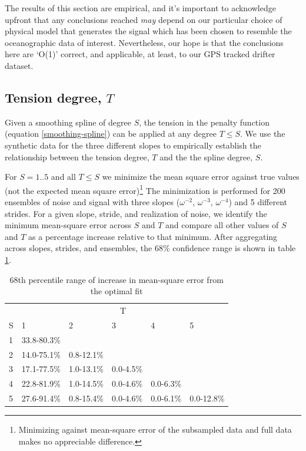 \documentclass[10pt,journal]{IEEEtran}
\begin{document}
The results of this section are empirical, and it's important to acknowledge upfront that any conclusions reached \emph{may} depend on our particular choice of physical model that generates the signal which has been chosen to resemble the oceanographic data of interest. Nevertheless, our hope is that the conclusions here are `O(1)' correct, and applicable, at least, to our GPS tracked drifter dataset.

\subsection{Tension degree, $T$} \label{tension_degree}

Given a smoothing spline of degree $S$, the tension in the penalty function (equation \ref{smoothing-spline}) can be applied at any degree $T\leq S$. We use the synthetic data for the three different slopes to empirically establish the relationship between the tension degree, $T$ and the the spline degree, $S$. 

For $S=1..5$ and all $T\leq S$ we minimize the mean square error against true values (not the expected mean square error)\footnote{Minimizing against mean-square error of the subsampled data and full data makes no appreciable difference.} The minimization is performed for 200 ensembles of noise and signal with three slopes ($\omega^{-2}$, $\omega^{-3}$, $\omega^{-4}$) and 5 different strides. For a given slope, stride, and realization of noise, we identify the minimum mean-square error across $S$ and $T$ and compare all other values of $S$ and $T$ as a percentage increase relative to that minimum. After aggregating across slopes, strides, and ensembles, the 68\% confidence range is shown in table \ref{optimal_T}.

\begin{table}[ht]
\caption{68th percentile range of increase in mean-square error from the optimal fit}
\label{optimal_T}
\centering

\begin{tabular}{l *{5}{l}}
\toprule & \multicolumn{5}{c}{T} \\ 
\cmidrule(lr){2-6} 
S & 1 & 2 & 3 & 4 & 5 \\ \midrule 
1 & 33.8-80.3\% & & & & \\ 
2 & 14.0-75.1\% & 0.8-12.1\% & & & \\ 
3 & 17.1-77.5\% & 1.0-13.1\% & 0.0-4.5\% & & \\ 
4 & 22.8-81.9\% & 1.0-14.5\% & 0.0-4.6\% & 0.0-6.3\% & \\ 
5 & 27.6-91.4\% & 0.8-15.4\% & 0.0-4.6\% & 0.0-6.1\% & 0.0-12.8\% \\ 
 \bottomrule 
\end{tabular} 
\end{table}
\end{document}
